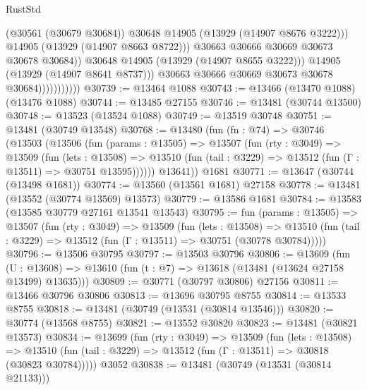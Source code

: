 \begin{lexlean}{RustStd}
\begin{coremodule}
                                      (@30561 (@30679 @30684))
                                      @30648
                                      @14905
                                      (@13929 (@14907 @8676 @3222)))
                                    @14905
                                    (@13929 (@14907 @8663 @8722)))
                                  @30663
                                  @30666
                                  @30669
                                  @30673
                                  @30678
                                  @30684))
                              @30648
                              @14905
                              (@13929 (@14907 @8655 @3222)))
                            @14905
                            (@13929 (@14907 @8641 @8737)))
                          @30663
                          @30666
                          @30669
                          @30673
                          @30678
                          @30684)))))))))))
@30739 := @13464 @1088
@30743 := @13466 (@13470 @1088) (@13476 @1088)
@30744 := @13485 @27155
@30746 := @13481 (@30744 @13500)
@30748 := @13523 (@13524 @1088)
@30749 := @13519 @30748
@30751 := @13481 (@30749 @13548)
@30768 := @13480
    (fun (fn : @74) =>
    @30746
      (@13503
        (@13506
          (fun (params : @13505) =>
          @13507
            (fun (rty : @3049) =>
            @13509
              (fun (lets : @13508) =>
              @13510 (fun (tail : @3229) => @13512 (fun (Γ : @13511) => @30751 @13595))))))
        @13641))
    @1681
@30771 := @13647 (@30744 (@13498 @1681))
@30774 := @13560 (@13561 @1681) @27158
@30778 := @13481 (@13552 (@30774 @13569) @13573)
@30779 := @13586 @1681
@30784 := @13583 (@13585 @30779 @27161 @13541 @13543)
@30795 := fun (params : @13505) =>
  @13507
    (fun (rty : @3049) =>
    @13509
      (fun (lets : @13508) =>
      @13510 (fun (tail : @3229) => @13512 (fun (Γ : @13511) => @30751 (@30778 @30784)))))
@30796 := @13506 @30795
@30797 := @13503 @30796
@30806 := @13609
    (fun (U : @13608) => @13610 (fun (t : @7) => @13618 (@13481 (@13624 @27158 @13499) @13635)))
@30809 := @30771 (@30797 @30806) @27156
@30811 := @13466 @30796 @30806
@30813 := @13696 @30795 @8755
@30814 := @13533 @8755
@30818 := @13481 (@30749 (@13531 (@30814 @13546)))
@30820 := @30774 (@13568 @8755)
@30821 := @13552 @30820
@30823 := @13481 (@30821 @13573)
@30834 := @13699
    (fun (rty : @3049) =>
    @13509
      (fun (lets : @13508) =>
      @13510 (fun (tail : @3229) => @13512 (fun (Γ : @13511) => @30818 (@30823 @30784)))))
    @3052
@30838 := @13481 (@30749 (@13531 (@30814 @21133)))

\end{coremodule}
\end{lexlean}
